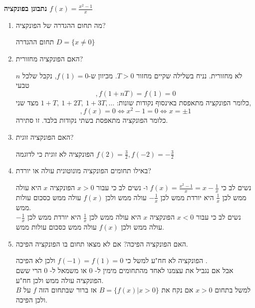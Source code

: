 \textbf{נתבונן בפונקציה
$f(x)=\frac{x^2-1}{x}$}
\begin{enumerate}
\item
מה תחום ההגדרה של הפונקציה?
\begin{solbox}
תחום ההגדרה
$D=\{x\neq 0\}$
\end{solbox}
\item
האם הפונקציה מחזורית?
\begin{solbox}
לא מחזורית. נניח בשלילה שקיים מחזור $T>0$. מכיוון ש-$f(1)=0$, נקבל שלכל $n$ טבעי
$$,f(1+nT)=f(1)=0$$
כלומר הפונקציה מתאפסת באינסוף נקודות שונות:
$1+T,\ 1+2T,\ 1+3T,\ldots$
מצד שני,
$$,f(x)=0\iff x^2-1=0\iff x=\pm1$$
כלומר הפונקציה מתאפסת בשתי נקודות בלבד. זו סתירה.
\end{solbox}
\item
האם הפונקציה זוגית?
\begin{solbox}
הפונקציה לא זוגית כי לדוגמה
$f(2)=\frac{3}{2}, f(-2)=-\frac{3}{2}$
\end{solbox}
\item
באילו תחומים הפונקציה מונוטונית עולה או יורדת?
\begin{solbox}
נשים לב כי
$f(x)=\frac{x^2-1}{x}=x-\frac{1}{x}$
ו-
נשים לב כי עבור
$x>0$
הפונקציה $x$ היא  עולה
ממש
לכן $\frac{1}{x}$
היא יורדת
ממש
לכן $-\frac{1}{x}$
עולה ממש ולכן
$f(x)$
עולה ממש כסכום עולות ממש.
\\
נשים לב כי עבור
$x<0$
הפונקציה $x$ היא  עולה
ממש
לכן $\frac{1}{x}$
היא יורדת
ממש
לכן $-\frac{1}{x}$
עולה ממש ולכן
$f(x)$
עולה ממש כסכום עולות ממש.
\end{solbox}
\item
האם הפונקציה הפיכה? אם לא מצאו תחום בו הפונקציה הפיכה.
\begin{solbox}
הפונקציה לא חח"ע למשל כי
$f(-1)=f(1)=0$
ולכן לא הפיכה
.
\\
אבל אם נגביל את עצמנו לאחד מהתחומים מימין ל- $0$ או משמאל ל- $
0$
הרי ששם הפונקציה עולה ממש ולכן חח"ע.\\

למשל בתחום
$x>0$
אם נקח את
$B=\{f(x)|x>0 \}$
אז ברור שבתחום הזה $f$
על
$B$
ולכן הפיכה.
\end{solbox}
\end{enumerate}
